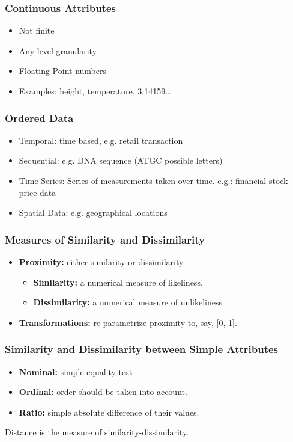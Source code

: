 \begin{frame}[fragile] \frametitle{Continuous Attributes}
\begin{itemize}
\item Not finite
\item Any level granularity
\item Floating Point numbers
\item Examples: height, temperature, 3.14159\ldots
\end{itemize}

\end{frame}

\begin{frame}[fragile]\frametitle{Ordered Data}	

\begin{itemize}
\item Temporal: time based, e.g. retail transaction
\item Sequential: e.g. DNA sequence (ATGC possible letters)
\item Time Series: Series of measurements taken over time. e.g.: financial stock price data
\item Spatial Data: e.g. geographical locations
\end{itemize}
\end{frame}

\begin{frame}[fragile]\frametitle{Measures of Similarity and Dissimilarity}

	\begin{itemize}
		\item {\bf Proximity:} either similarity or dissimilarity
			\begin{itemize}
		\item {\bf Similarity:} a numerical measure of likeliness.
		\item{\bf Dissimilarity:} a numerical measure of unlikeliness
		\end{itemize}
		\item {\bf Transformations:} re-parametrize proximity to, say, [0, 1].
\end{itemize}
\end{frame}

\begin{frame}[fragile]\frametitle{Similarity and Dissimilarity between Simple Attributes}

		\begin{itemize}
			\item{\bf Nominal:} simple equality test
			\item{\bf Ordinal:} order should be taken into account.
			\item{\bf Ratio:} simple absolute difference of their values.
\end{itemize}
Distance is the measure of similarity-dissimilarity.
\end{frame}

